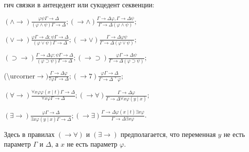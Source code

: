 \documentclass[10pt]{article}
\begin{document}
гич связки в антецедент или сукцедент секвенции:



$(\wedge \rightarrow) \frac{\varphi \psi \Gamma \rightarrow \Delta}{(\varphi \wedge \psi) \Gamma \rightarrow \Delta} ;(\rightarrow \wedge) \frac{\Gamma \rightarrow \Delta \varphi, \Gamma \rightarrow \Delta \psi}{\Gamma \rightarrow \Delta(\varphi \wedge \psi)} ;$



$(\vee \rightarrow) \frac{\varphi \Gamma \rightarrow \Delta ; \psi \Gamma \rightarrow \Delta}{(\varphi \vee \psi) \Gamma \rightarrow \Delta} ;(\rightarrow \vee) \frac{\Gamma \rightarrow \Delta \varphi \psi}{\Gamma \rightarrow \Delta(\varphi \vee \psi)} ;$



$(\supset \rightarrow) \frac{\Gamma \rightarrow \Delta \varphi ; \psi \Gamma \rightarrow \Delta}{(\varphi \supset \psi) \Gamma \rightarrow \Delta} ;(\rightarrow \supset) \frac{\varphi \Gamma \rightarrow \Delta \psi}{\Gamma \rightarrow \Delta(\varphi \supset \psi)} ;$



(\textbackslash urcorner$\rightarrow) \frac{\Gamma \rightarrow \Delta \varphi}{7 \varphi \Gamma \rightarrow \Delta} ;(\rightarrow 7) \frac{\varphi \Gamma \rightarrow \Delta}{\Gamma \rightarrow \Delta\urcorner \varphi} ;$



$(\forall \rightarrow) \frac{\forall x \varphi \varphi(x \mid t) \Gamma \rightarrow \Delta}{\forall x \varphi \Gamma \rightarrow \Delta} ;(\rightarrow \forall) \frac{\Gamma \rightarrow \Delta \varphi}{\Gamma \rightarrow \Delta \forall x \varphi(y \mid x)} ;$



$(\exists \rightarrow) \frac{\varphi \Gamma \rightarrow \Delta}{\exists x \varphi(y \mid x) \Gamma \rightarrow \Delta} ;(\rightarrow \exists) \frac{\Gamma \rightarrow \Delta \varphi(x \mid t) \exists x \varphi}{\Gamma \rightarrow \Delta \exists x \varphi}$.



Здесь в правилах $(\rightarrow \forall)$ и $(\exists \rightarrow)$ предполагается, что переменная $y$ не есть параметр $\Gamma$ и $\Delta$, а $x$ не есть параметр $\varphi$.
\end{document}
